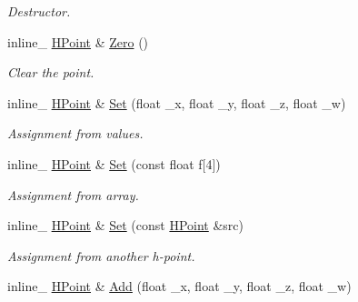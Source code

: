 \begin{DoxyCompactItemize}
\begin{DoxyCompactList}\small\item\em Destructor. \end{DoxyCompactList}\item 
inline\+\_\+ \hyperlink{classHPoint}{H\+Point} \& \hyperlink{classHPoint_a23b827b1070296cd7a14663c8dc138fc}{Zero} ()\hypertarget{classHPoint_a23b827b1070296cd7a14663c8dc138fc}{}\label{classHPoint_a23b827b1070296cd7a14663c8dc138fc}

\begin{DoxyCompactList}\small\item\em Clear the point. \end{DoxyCompactList}\item 
inline\+\_\+ \hyperlink{classHPoint}{H\+Point} \& \hyperlink{classHPoint_a6bc4170ff94bceba2b87e6e808eaec5f}{Set} (float \+\_\+x, float \+\_\+y, float \+\_\+z, float \+\_\+w)\hypertarget{classHPoint_a6bc4170ff94bceba2b87e6e808eaec5f}{}\label{classHPoint_a6bc4170ff94bceba2b87e6e808eaec5f}

\begin{DoxyCompactList}\small\item\em Assignment from values. \end{DoxyCompactList}\item 
inline\+\_\+ \hyperlink{classHPoint}{H\+Point} \& \hyperlink{classHPoint_abcf02d3721448daad95a079045e533bb}{Set} (const float f\mbox{[}4\mbox{]})\hypertarget{classHPoint_abcf02d3721448daad95a079045e533bb}{}\label{classHPoint_abcf02d3721448daad95a079045e533bb}

\begin{DoxyCompactList}\small\item\em Assignment from array. \end{DoxyCompactList}\item 
inline\+\_\+ \hyperlink{classHPoint}{H\+Point} \& \hyperlink{classHPoint_a1e94bdece89d1aac96f95df9ebd79eaf}{Set} (const \hyperlink{classHPoint}{H\+Point} \&src)\hypertarget{classHPoint_a1e94bdece89d1aac96f95df9ebd79eaf}{}\label{classHPoint_a1e94bdece89d1aac96f95df9ebd79eaf}

\begin{DoxyCompactList}\small\item\em Assignment from another h-\/point. \end{DoxyCompactList}\item 
inline\+\_\+ \hyperlink{classHPoint}{H\+Point} \& \hyperlink{classHPoint_a33767b385428491a53b0cd86f7671ee1}{Add} (float \+\_\+x, float \+\_\+y, float \+\_\+z, float \+\_\+w)\hypertarget{classHPoint_a33767b385428491a53b0cd86f7671ee1}{}\label{classHPoint_a33767b385428491a53b0cd86f7671ee1}


\end{DoxyCompactItemize}
